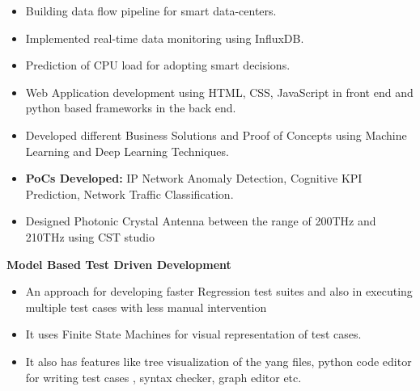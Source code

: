 \documentclass[10pt,a4paper,ragged2e]{classfile}
\begin{document}
\begin{itemize}[label=\textcolor{blue}{\textbullet}]
\item Building data flow pipeline for smart data-centers.
\item Implemented real-time data monitoring using InfluxDB.
\item Prediction of CPU load for adopting smart decisions.

\divider

\end{itemize}

\begin{itemize}[label=\textcolor{blue}{\textbullet}]
\item Web Application development using HTML, CSS, JavaScript in front end and python based frameworks in the back end.
\item Developed different Business Solutions and Proof of Concepts using Machine Learning and Deep Learning Techniques.
\item \textbf{PoCs Developed: }IP Network Anomaly Detection, Cognitive KPI
Prediction, Network Traffic Classification.
\end{itemize}


\divider


\begin{itemize}[label=\textcolor{blue}{\textbullet}]
\item Designed Photonic Crystal Antenna between the range of 200THz and 210THz using CST studio

\end{itemize}
\divider

\newpage


\textbf{Model Based Test Driven Development}

\begin{itemize}[label=\textcolor{blue}{\textbullet}]
\item An approach for developing faster Regression test suites and also in executing multiple test cases with less manual intervention 
\item  It uses Finite State Machines for visual representation of test cases.
\item It also has features like tree visualization of the yang files, python code editor for writing test cases , syntax checker, graph editor etc.
\end{itemize}
\end{document}
